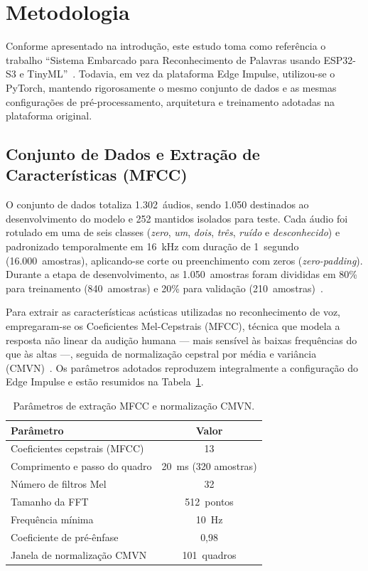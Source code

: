 \section{Metodologia}

Conforme apresentado na introdução, este estudo toma como referência o trabalho ``Sistema Embarcado para Reconhecimento de Palavras usando ESP32-S3 e TinyML''~\cite{carlos2025}.      
Todavia, em vez da plataforma Edge Impulse, utilizou-se o PyTorch, mantendo rigorosamente o mesmo conjunto de dados e as mesmas configurações de pré-processamento, arquitetura e      
treinamento adotadas na plataforma original.

\subsection{Conjunto de Dados e Extração de Características (MFCC)}

O conjunto de dados totaliza 1.302~áudios, sendo 1.050 destinados ao desenvolvimento do modelo e 252 mantidos isolados para teste. Cada áudio foi rotulado em uma de seis classes      
(\textit{zero}, \textit{um}, \textit{dois}, \textit{três}, \textit{ruído} e \textit{desconhecido}) e padronizado temporalmente em 16~kHz com duração de 1~segundo (16.000~amostras),   
aplicando-se corte ou preenchimento com zeros (\textit{zero-padding}). Durante a etapa de desenvolvimento, as 1.050~amostras foram divididas em 80\% para treinamento (840~amostras) e 
20\% para validação (210~amostras)~\cite{carlos2025}.

Para extrair as características acústicas utilizadas no reconhecimento de voz, empregaram-se os Coeficientes Mel-Cepstrais (MFCC), técnica que modela a resposta não linear da audição 
humana --- mais sensível às baixas frequências do que às altas ---, seguida de normalização cepstral por média e variância (CMVN)~\cite{carlos2025,pereira2023}. Os parâmetros adotados
reproduzem integralmente a configuração do Edge Impulse e estão resumidos na Tabela~\ref{tab:mfcc}.

\begin{table}[htbp]
\centering
\caption{Parâmetros de extração MFCC e normalização CMVN.}
\label{tab:mfcc}
\begin{tabular}{lc} 
\toprule
\textbf{Parâmetro} & \textbf{Valor} \\ 
\midrule
Coeficientes cepstrais (MFCC) & 13 \\ 
Comprimento e passo do quadro & 20~ms (320 amostras) \\
Número de filtros Mel & 32 \\
Tamanho da FFT & 512~pontos \\
Frequência mínima & 10~Hz \\
Coeficiente de pré-ênfase & 0,98 \\
Janela de normalização CMVN & 101~quadros \\
\bottomrule
\end{tabular}
\end{table}

